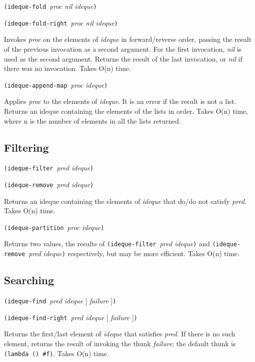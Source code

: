 \texttt{(ideque-fold\ }\emph{proc nil ideque}\texttt{)}

\texttt{(ideque-fold-right\ }\emph{proc nil ideque}\texttt{)}

Invokes \emph{proc} on the elements of \emph{ideque} in forward/reverse
order, passing the result of the previous invocation as a second
argument. For the first invocation, \emph{nil} is used as the second
argument. Returns the result of the last invocation, or \emph{nil} if
there was no invocation. Takes O(n) time.

\texttt{(ideque-append-map\ }\emph{proc ideque}\texttt{)}

Applies \emph{proc} to the elements of \emph{ideque}. It is an error if
the result is not a list. Returns an ideque containing the elements of
the lists in order. Takes O(n) time, where n is the number of elements
in all the lists returned.

\hypertarget{Filtering}{\subsection{Filtering}\label{Filtering}}

\texttt{(ideque-filter\ }\emph{pred ideque}\texttt{)}

\texttt{(ideque-remove\ }\emph{pred ideque}\texttt{)}

Returns an ideque containing the elements of \emph{ideque} that do/do
not satisfy \emph{pred}. Takes O(n) time.

\texttt{(ideque-partition\ }\emph{proc ideque}\texttt{)}

Returns two values, the results of \texttt{(ideque-filter\ }\emph{pred
ideque}\texttt{)} and \texttt{(ideque-remove\ }\emph{pred
ideque}\texttt{)} respectively, but may be more efficient. Takes O(n)
time.

\hypertarget{Searching}{\subsection{Searching}\label{Searching}}

\texttt{(ideque-find\ }\emph{pred ideque} {[} \emph{failure}
{]}\texttt{)}

\texttt{(ideque-find-right\ }\emph{pred ideque} {[} \emph{failure}
{]}\texttt{)}

Returns the first/last element of \emph{ideque} that satisfies
\emph{pred}. If there is no such element, returns the result of invoking
the thunk \emph{failure}; the default thunk is
\texttt{(lambda\ ()\ \#f)}. Takes O(n) time.

